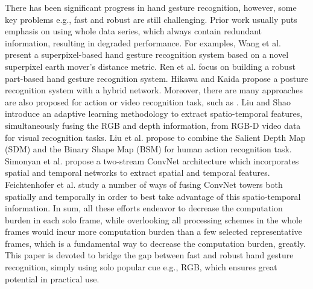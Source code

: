 \documentclass[5p]{elsarticle}
\begin{document}
There has been significant progress in hand gesture recognition, however, some key problems e.g., fast and robust are still challenging.
Prior work usually puts emphasis on using whole data series, which always contain redundant information, resulting in degraded performance.
For examples, Wang et al. \cite{wang2015superpixel} present a superpixel-based hand gesture recognition system based on a novel superpixel earth mover's distance metric.
Ren et al. \cite{ren2013robust} focus on building a robust part-based hand gesture recognition system.
Hikawa and Kaida \cite{hikawa2015novel} propose a posture recognition system with a hybrid network.
Moreover, there are many approaches are also proposed for action or video recognition task, such as \cite{liu2013learning,yu2016structure,tang2015gender,tran2015learning,shao2016kernelized,wang2016temporal,ji20133d,liu2016sequential,qin2017zero,liu2015sdm}.
Liu and Shao \cite{liu2013learning} introduce an adaptive learning methodology to extract spatio-temporal features, simultaneously fusing the RGB and depth information, from RGB-D video data for visual recognition tasks.
Liu et al. \cite{liu2015sdm} propose to combine the Salient Depth Map (SDM) and the Binary Shape Map (BSM) for human action recognition task.
Simonyan et al. \cite{simonyan2014two} propose a two-stream ConvNet architecture which incorporates spatial and temporal networks to extract spatial and temporal features.
Feichtenhofer et al. \cite{feichtenhofer2016convolutional} study a number of ways of fusing ConvNet towers both spatially and temporally in order to best take advantage of this spatio-temporal information.
In sum, all these efforts endeavor to decrease the computation burden in each solo frame, while overlooking all processing schemes in the whole frames would incur more computation burden than a few selected representative frames, which is a fundamental way to decrease the computation burden, greatly.
This paper is devoted to bridge the gap between fast and robust hand gesture recognition, simply using solo popular cue e.g., RGB, which ensures great potential in practical use.
\end{document}
